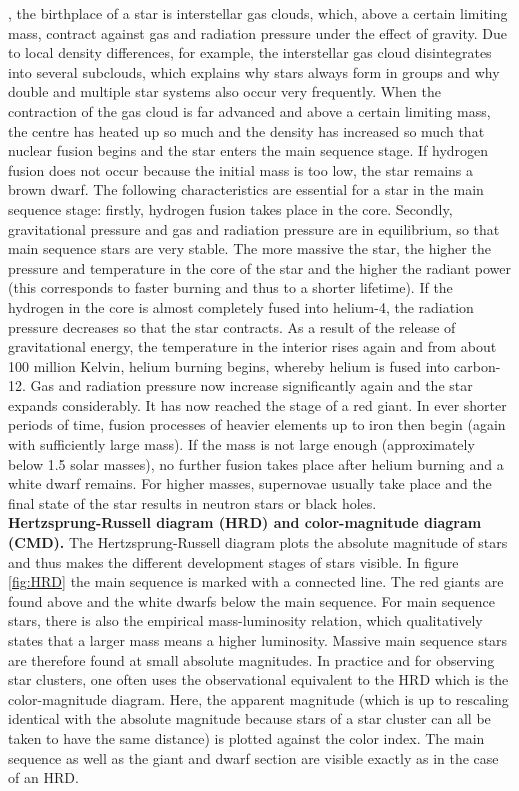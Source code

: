 \documentclass[fleqn,10pt]{SelfArx} %
\begin{document}
, the birthplace of a star is interstellar gas clouds, which, above a certain limiting mass, contract against gas and radiation pressure under the effect of gravity. Due to local density differences, for example, the interstellar gas cloud disintegrates into several subclouds, which explains why stars always form in groups and why double and multiple star systems also occur very frequently. When the contraction of the gas cloud is far advanced and above a certain limiting mass, the centre has heated up so much and the density has increased so much that nuclear fusion begins and the star enters the main sequence stage. If hydrogen fusion does not occur because the initial mass is too low, the star remains a brown dwarf. The following characteristics are essential for a star in the main sequence stage: firstly, hydrogen fusion takes place in the core. Secondly, gravitational pressure and gas and radiation pressure are in equilibrium, so that main sequence stars are very stable. The more massive the star, the higher the pressure and temperature in the core of the star and the higher the radiant power (this corresponds to faster burning and thus to a shorter lifetime). If the hydrogen in the core is almost completely fused into helium-4, the radiation pressure decreases so that the star contracts. As a result of the release of gravitational energy, the temperature in the interior rises again and from about 100 million Kelvin, helium burning begins, whereby helium is fused into carbon-12. Gas and radiation pressure now increase significantly again and the star expands considerably. It has now reached the stage of a red giant. In ever shorter periods of time, fusion processes of heavier elements up to iron then begin (again with sufficiently large mass). If the mass is not large enough (approximately below 1.5 solar masses), no further fusion takes place after helium burning and a white dwarf remains. For higher masses, supernovae usually take place and the final state of the star results in neutron stars or black holes.
\\
\textbf{Hertzsprung-Russell diagram (HRD) and color-magnitude diagram (CMD).} The Hertzsprung-Russell diagram plots the absolute magnitude of stars and thus makes the different development stages of stars visible. In figure \ref{fig:HRD} the main sequence is marked with a connected line. The red giants are found above and the white dwarfs below the main sequence. For main sequence stars, there is also the empirical mass-luminosity relation, which qualitatively states that a larger mass means a higher luminosity. Massive main sequence stars are therefore found at small absolute magnitudes. In practice and for observing star clusters, one often uses the observational equivalent to the HRD which is the color-magnitude diagram. Here, the apparent magnitude (which is up to rescaling identical with the absolute magnitude because stars of a star cluster can all be taken to have the same distance) is plotted against the color index. The main sequence as well as the giant and dwarf section are visible exactly as in the case of an HRD.
\\
\end{document}
